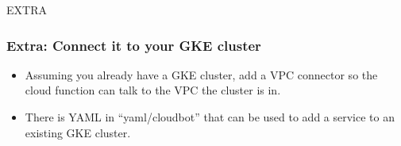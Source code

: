 \documentclass[aspectratio=169]{beamer}
\begin{document}

\begin{frame}
	\Huge \textcolor{dgreen}{EXTRA}
\end{frame}
                                                                       

\begin{frame}
	\frametitle{Extra: Connect it to your GKE cluster}
	\begin{itemize}
		\item Assuming you already have a GKE cluster, add a VPC connector so the cloud function can talk to the VPC the cluster is in.
		\item There is YAML in ``yaml/cloudbot'' that can be used to add a service to an existing GKE cluster.
	\end{itemize}
\end{frame}
\end{document}
